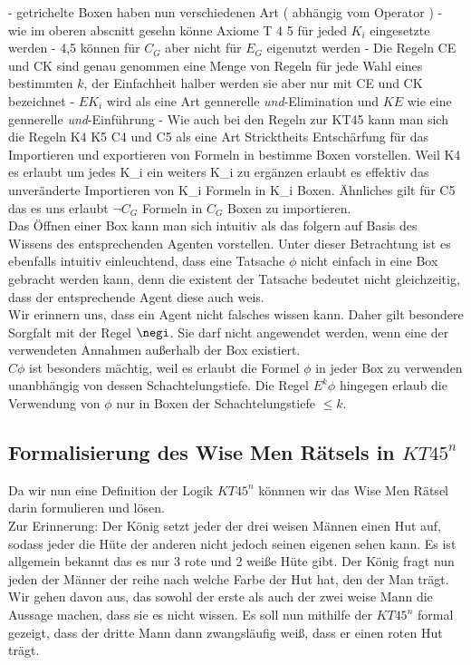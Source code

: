 - getrichelte Boxen haben nun verschiedenen Art ( abhängig vom Operator )
- wie im oberen abscnitt gesehn könne Axiome T 4 5 für jeded $K_i$ eingesetzte werden
 - 4,5 können für $C_G$ aber nicht für $E_G$ eigenutzt werden
- Die Regeln CE und CK sind genau genommen eine Menge von Regeln für jede Wahl eines bestimmten $k$, der Einfachheit halber werden sie aber nur mit CE und CK bezeichnet
- $EK_i$ wird als eine Art gennerelle \emph{und}-Elimination und $KE$ wie eine gennerelle \emph{und}-Einführung
- Wie auch bei den Regeln zur KT45 kann man sich die Regeln K4 K5 C4 und C5 als eine Art Stricktheits Entschärfung für das Importieren und exportieren von Formeln in bestimme Boxen vorstellen.
Weil K4 es erlaubt um jedes K_i ein weiters K_i zu ergänzen erlaubt es effektiv das unveränderte Importieren von K_i \phi Formeln in K_i Boxen.
Ähnliches gilt für C5 das es uns erlaubt $\neg C_G$ Formeln in $C_G$ Boxen zu importieren.\\
Das Öffnen einer Box kann man sich intuitiv als das folgern auf Basis des Wissens des entsprechenden Agenten vorstellen.
Unter dieser Betrachtung ist es ebenfalls intuitiv einleuchtend, dass eine Tatsache $\phi$ nicht einfach in eine Box gebracht werden kann, denn die existent der Tatsache bedeutet nicht gleichzeitig, dass der entsprechende Agent diese auch weis.\\
Wir erinnern uns, dass ein Agent nicht falsches wissen kann.
Daher gilt besondere Sorgfalt mit der Regel $\negi$.
Sie darf nicht angewendet werden, wenn eine der verwendeten Annahmen außerhalb der Box existiert.\\
$C\phi$ ist besonders mächtig, weil es erlaubt die Formel $\phi$ in jeder Box zu verwenden unanbhängig von dessen Schachtelungstiefe.
Die Regel $E^k \phi$ hingegen erlaub die Verwendung von $\phi$ nur in Boxen der Schachtelungstiefe $\leq k$.





\subsection{Formalisierung des Wise Men Rätsels in $KT45^n$}
Da wir nun eine Definition der Logik $KT45^n$ könnnen wir das Wise Men Rätsel darin formulieren und lösen.\\
Zur Erinnerung: Der König setzt jeder der drei weisen Männen einen Hut auf, sodass jeder die Hüte der anderen nicht jedoch seinen eigenen sehen kann.
Es ist allgemein bekannt das es nur 3 rote und 2 weiße Hüte gibt.
Der König fragt nun jeden der Männer der reihe nach welche Farbe der Hut hat, den der Man trägt.
Wir gehen davon aus, das sowohl der erste als auch der zwei weise Mann die Aussage machen, dass sie es nicht wissen.
Es soll nun mithilfe der $KT45^n$ formal gezeigt, dass der dritte Mann dann zwangsläufig weiß, dass er einen roten Hut trägt.

